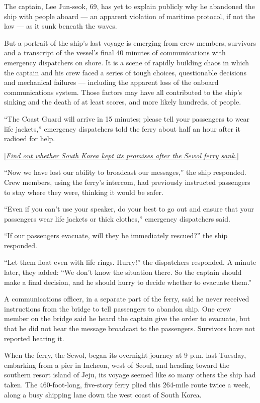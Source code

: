 The captain, Lee Jun-seok, 69, has yet to explain publicly why he
abandoned the ship with people aboard --- an apparent violation of
maritime protocol, if not the law --- as it sunk beneath the waves.

But a portrait of the ship's last voyage is emerging from crew members,
survivors and a transcript of the vessel's final 40 minutes of
communications with emergency dispatchers on shore. It is a scene of
rapidly building chaos in which the captain and his crew faced a series
of tough choices, questionable decisions and mechanical failures ---
including the apparent loss of the onboard communications system. Those
factors may have all contributed to the ship's sinking and the death of
at least scores, and more likely hundreds, of people.

``The Coast Guard will arrive in 15 minutes; please tell your passengers
to wear life jackets,'' emergency dispatchers told the ferry about half
an hour after it radioed for help.

{[}\emph{\href{https://www.nytimes.com/2019/06/10/world/asia/sewol-ferry-accident.html?module=inline}{Find
out whether South Korea kept its promises after the Sewol ferry
sank.}}{]}

``Now we have lost our ability to broadcast our messages,'' the ship
responded. Crew members, using the ferry's intercom, had previously
instructed passengers to stay where they were, thinking it would be
safer.

``Even if you can't use your speaker, do your best to go out and ensure
that your passengers wear life jackets or thick clothes,'' emergency
dispatchers said.

``If our passengers evacuate, will they be immediately rescued?'' the
ship responded.

``Let them float even with life rings. Hurry!'' the dispatchers
responded. A minute later, they added: ``We don't know the situation
there. So the captain should make a final decision, and he should hurry
to decide whether to evacuate them.''

A communications officer, in a separate part of the ferry, said he never
received instructions from the bridge to tell passengers to abandon
ship. One crew member on the bridge said he heard the captain give the
order to evacuate, but that he did not hear the message broadcast to the
passengers. Survivors have not reported hearing it.

When the ferry, the Sewol, began its overnight journey at 9 p.m. last
Tuesday, embarking from a pier in Incheon, west of Seoul, and heading
toward the southern resort island of Jeju, its voyage seemed like so
many others the ship had taken. The 460-foot-long, five-story ferry
plied this 264-mile route twice a week, along a busy shipping lane down
the west coast of South Korea.

